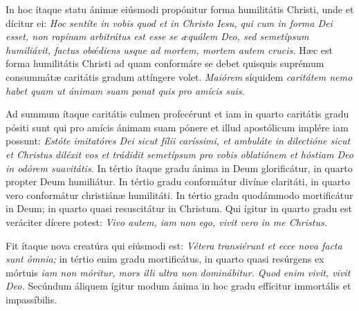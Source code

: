 {\noindent In hoc ítaque statu ánimæ eiúsmodi propónitur forma humilitátis Christi, unde et dícitur ei: \textit{Hoc sentíte in vobis quod et in Christo Iesu, qui cum in forma Dei esset, non rapínam arbitrátus est esse se æquálem Deo, sed semetípsum humiliávit, factus obœ́diens usque ad mortem, mortem autem crucis.} Hæc est forma humilitátis Christi ad quam conformáre se debet quisquis suprémum consummátæ caritátis gradum attíngere volet. \textit{Maiórem} síquidem \textit{caritátem nemo habet quam ut ánimam suam ponat quis pro amícis suis.}

\noindent Ad summum ítaque caritátis culmen profecérunt et iam in quarto caritátis gradu pósiti sunt qui pro amícis ánimam suam pónere et illud apostólicum implére iam possunt: \textit{Estóte imitatóres Dei sicut fílii caríssimi, et ambuláte in dilectióne sicut et Christus diléxit vos et trádidit semetípsum pro vobis oblatiónem et hóstiam Deo in odórem suavitátis.} In tértio ítaque gradu ánima in Deum glorificátur, in quarto propter Deum humiliátur. In tértio gradu conformátur divínæ claritáti, in quarto vero conformátur christiánæ humilitáti. In tértio gradu quodámmodo mortificátur in Deum; in quarto quasi resuscitátur in Christum. Qui ígitur in quarto gradu est veráciter dícere potest: \textit{Vivo autem, iam non ego, vivit vero in me Christus.}

\noindent Fit ítaque nova creatúra qui eiúsmodi est: \textit{Vétera transiérunt et ecce nova facta sunt ómnia;} in tértio enim gradu mortificátus, in quarto quasi resúrgens ex mórtuis \textit{iam non móritur, mors illi ultra non dominábitur. Quod enim vivit, vivit Deo.} Secúndum áliquem ígitur modum ánima in hoc gradu effícitur immortális et impassíbilis.

\vfill
\pagebreak

 

\vspace{-5mm}


\vfill


\vspace{3mm}

 

\vspace{-5mm}


\vfill
\pagebreak
}
